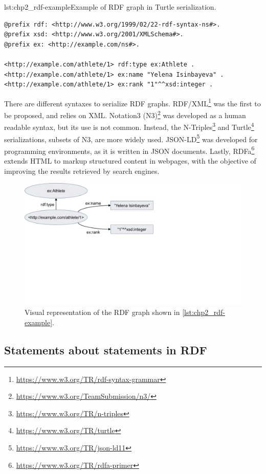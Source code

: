 \begin{minipage}{\textwidth}
\begin{captionedlisting}{lst:chp2_rdf-example}{Example of RDF graph in Turtle serialization.}
\centering
{\begin{lstlisting}[language=r2rml]
@prefix rdf: <http://www.w3.org/1999/02/22-rdf-syntax-ns#>.
@prefix xsd: <http://www.w3.org/2001/XMLSchema#>.
@prefix ex: <http://example.com/ns#>.

<http://example.com/athlete/1> rdf:type ex:Athlete .
<http://example.com/athlete/1> ex:name "Yelena Isinbayeva" .
<http://example.com/athlete/1> ex:rank "1"^^xsd:integer .
\end{lstlisting}}
\end{captionedlisting}
\end{minipage}

There are different syntaxes to serialize RDF graphs. RDF/XML\footnote{\url{https://www.w3.org/TR/rdf-syntax-grammar}} was the first to be proposed, and relies on XML. Notation3 (N3)\footnote{\url{https://www.w3.org/TeamSubmission/n3/}} was developed as a human readable syntax, but its use is not common. Instead, the N-Triples\footnote{\url{https://www.w3.org/TR/n-triples}} and Turtle\footnote{\url{https://www.w3.org/TR/turtle}} serializations, subsets of N3, are more widely used. JSON-LD\footnote{\url{https://www.w3.org/TR/json-ld11}} was developed for programming environments, as it is written in JSON documents. Lastly, RDFa\footnote{\url{https://www.w3.org/TR/rdfa-primer}} extends HTML to markup structured content in webpages, with the objective of improving the results retrieved by search engines. 



\begin{figure}[t]
\centering
\includegraphics[width=0.6\linewidth]{figures/chp2_rdf-example.pdf}
\caption[RDF graph example]{Visual representation of the RDF graph shown in \cref{lst:chp2_rdf-example}.}
\label{fig:chp2_rdf-example}
\end{figure}

\subsection{Statements about statements in RDF}
\label{sec:chp2_reifications}

